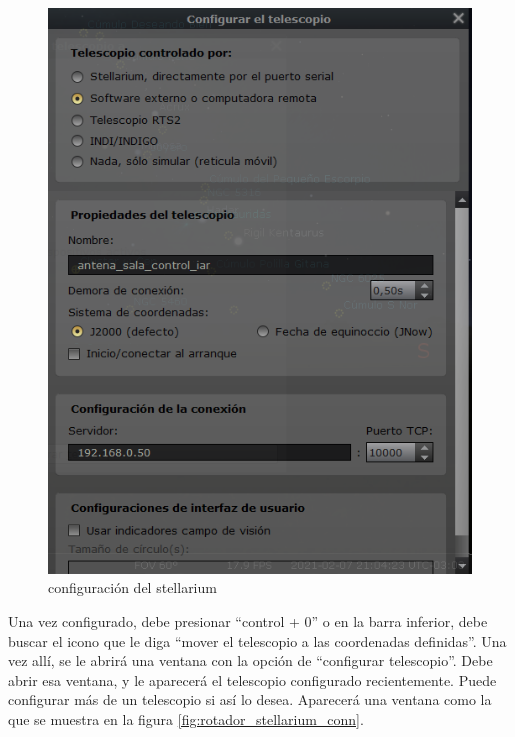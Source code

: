 \begin{figure}[ht]
	\centering 
	\includegraphics[scale=0.5]{configuracion_telescopio}
	\caption{configuración del stellarium} 
	\label{fig:conf_net_stell}
\end{figure}  

Una vez configurado, debe presionar ``control + 0'' o en la barra inferior, debe buscar el icono que le diga ``mover el telescopio a las coordenadas definidas''. Una vez allí, se le abrirá una ventana con la opción de ``configurar telescopio''. Debe abrir esa ventana, y le aparecerá el telescopio configurado recientemente. Puede configurar más de un telescopio si así lo desea. Aparecerá una ventana como la que se muestra en la figura \ref{fig:rotador_stellarium_conn}. 
 

